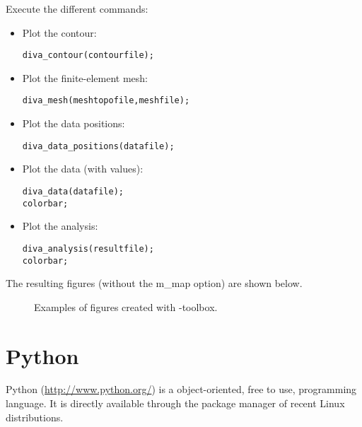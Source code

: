 Execute the different commands:
\begin{itemize}
\item Plot the contour:
\begin{lstlisting}[style=Matlab]
diva_contour(contourfile);
\end{lstlisting}

\item Plot the finite-element mesh:
\begin{lstlisting}[style=Matlab]
diva_mesh(meshtopofile,meshfile);
\end{lstlisting}


\item Plot the data positions:
\begin{lstlisting}[style=Matlab]
diva_data_positions(datafile);
\end{lstlisting}

\item Plot the data (with values):
\begin{lstlisting}[style=Matlab]
diva_data(datafile);
colorbar;
\end{lstlisting}

\item Plot the analysis:
\begin{lstlisting}[style=Matlab]
diva_analysis(resultfile);
colorbar;
\end{lstlisting}


\end{itemize}



The resulting figures (without the m\_map option) are shown below.

\begin{figure}[H]
\centering
{}
\caption{Examples of figures created with \diva-\matlab toolbox.}
\end{figure}



\section{Python}

Python (\url{http://www.python.org/}) is a object-oriented, free to use, programming language. It is directly available through the package manager of recent Linux distributions.

